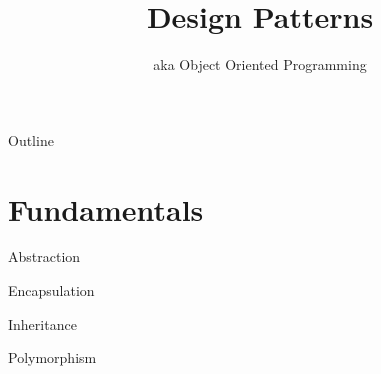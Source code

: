 \documentclass{beamer}
\title{Design Patterns}
\subtitle{aka Object Oriented Programming}
\begin{document}
\begin{frame}
  \titlepage
\end{frame}

\begin{frame}{Outline}
  \tableofcontents
\end{frame}

\section{Fundamentals}

\begin{frame}{Abstraction}
\end{frame}

\begin{frame}{Encapsulation}
\end{frame}

\begin{frame}{Inheritance}
\end{frame}

\begin{frame}{Polymorphism}
\end{frame}
\end{document}
